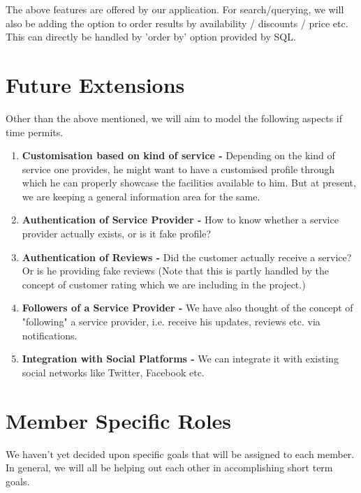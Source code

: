 \documentclass[a4paper]{article}
\begin{document}
The above features are offered by our application. For search/querying, we will also be adding the option to order results by availability / discounts / price etc. This can directly be handled by 'order by' option provided by SQL.



\section{Future Extensions}
Other than the above mentioned, we will aim to model the following aspects if time permits. 

\begin{enumerate}
\item \textbf{Customisation based on kind of service -} Depending on the kind of service one provides, he might want to have a customised profile through which he can properly showcase the facilities available to him. But at present, we are keeping a general information area for the same.
\item \textbf{Authentication of Service Provider -} How to know whether a service provider actually exists, or is it fake profile?
\item \textbf{Authentication of Reviews -} Did the customer actually receive a service? Or is he providing fake reviews (Note that this is partly handled by the concept of customer rating which we are including in the project.)
\item \textbf{Followers of a Service Provider - }We have also thought of the concept of "following" a service provider, i.e. receive his updates, reviews etc. via notifications.
\item \textbf{Integration with Social Platforms - }We can integrate it with existing social networks like Twitter, Facebook etc.
\end{enumerate}


\section{Member Specific Roles}
We haven't yet decided upon specific goals that will be assigned to each member. In general, we will all be helping out each other in accomplishing short term goals.
\end{document}
